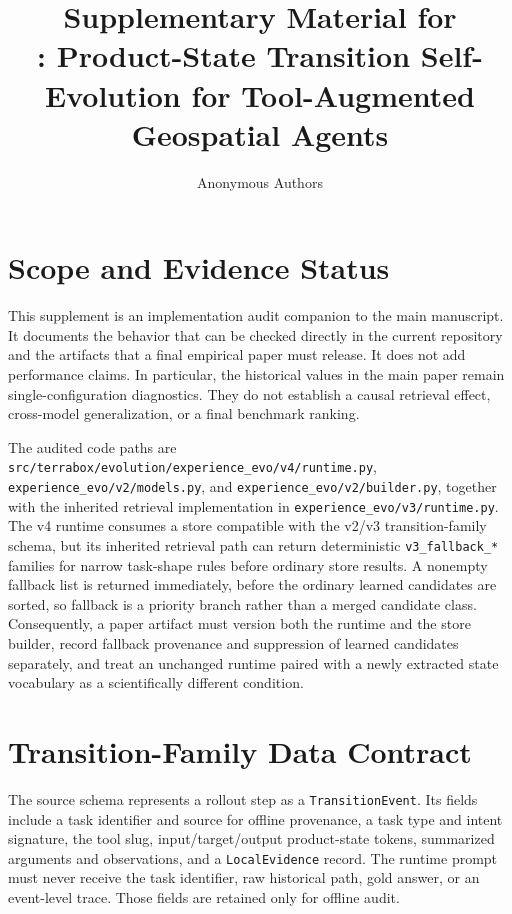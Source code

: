 \documentclass[10pt]{article}
\title{Supplementary Material for \\ \method: Product-State Transition Self-Evolution for Tool-Augmented Geospatial Agents}
\author{Anonymous Authors}
\date{}
\begin{document}
\maketitle

\section{Scope and Evidence Status}
This supplement is an implementation audit companion to the main manuscript. It documents the behavior that can be checked directly in the current repository and the artifacts that a final empirical paper must release. It does not add performance claims. In particular, the historical values in the main paper remain single-configuration diagnostics. They do not establish a causal retrieval effect, cross-model generalization, or a final benchmark ranking.

The audited code paths are \texttt{src/terrabox/evolution/experience\_evo/v4/runtime.py}, \texttt{experience\_evo/v2/models.py}, and \texttt{experience\_evo/v2/builder.py}, together with the inherited retrieval implementation in \texttt{experience\_evo/v3/runtime.py}. The v4 runtime consumes a store compatible with the v2/v3 transition-family schema, but its inherited retrieval path can return deterministic \texttt{v3\_fallback\_*} families for narrow task-shape rules before ordinary store results. A nonempty fallback list is returned immediately, before the ordinary learned candidates are sorted, so fallback is a priority branch rather than a merged candidate class. Consequently, a paper artifact must version both the runtime and the store builder, record fallback provenance and suppression of learned candidates separately, and treat an unchanged runtime paired with a newly extracted state vocabulary as a scientifically different condition.

\section{Transition-Family Data Contract}
The source schema represents a rollout step as a \texttt{TransitionEvent}. Its fields include a task identifier and source for offline provenance, a task type and intent signature, the tool slug, input/target/output product-state tokens, summarized arguments and observations, and a \texttt{LocalEvidence} record. The runtime prompt must never receive the task identifier, raw historical path, gold answer, or an event-level trace. Those fields are retained only for offline audit.
\end{document}
